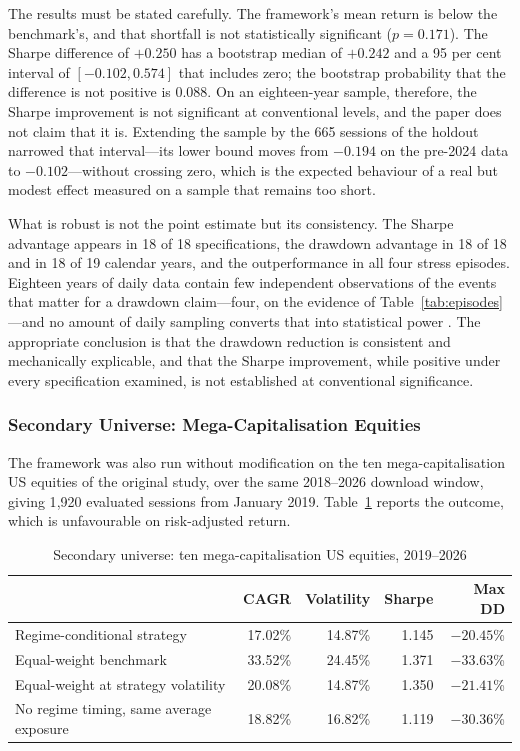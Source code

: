 \documentclass{singlecol-new}
\theoremstyle{TH}{
\newtheorem{lemma}{Lemma}
\newtheorem{theorem}[lemma]{Theorem}
\newtheorem{corrolary}[lemma]{Corrolary}
\newtheorem{conjecture}[lemma]{Conjecture}
\newtheorem{proposition}[lemma]{Proposition}
\newtheorem{claim}[lemma]{Claim}
\newtheorem{stheorem}[lemma]{Wrong Theorem}
\newtheorem{algorithm}{Algorithm}
}
\theoremstyle{THrm}{
\newtheorem{definition}{Definition}[section]
\newtheorem{question}{Question}[section]
\newtheorem{remark}{Remark}
\newtheorem{scheme}{Scheme}
}
\theoremstyle{THhit}{
\newtheorem{case}{Case}[section]
}
\begin{document}
The results must be stated carefully. The framework's mean return is below the
benchmark's, and that shortfall is not statistically significant ($p = 0.171$). The
Sharpe difference of $+0.250$ has a bootstrap median of $+0.242$ and a 95 per cent
interval of $[-0.102, 0.574]$ that includes zero; the bootstrap probability that the
difference is not positive is 0.088. On an eighteen-year sample, therefore, the Sharpe
improvement is not significant at conventional levels, and the paper does not claim that
it is. Extending the sample by the 665 sessions of the holdout narrowed that
interval---its lower bound moves from $-0.194$ on the pre-2024 data to $-0.102$---without
crossing zero, which is the expected behaviour of a real but modest effect measured on a
sample that remains too short.

What is robust is not the point estimate but its consistency. The Sharpe advantage
appears in 18 of 18 specifications, the drawdown advantage in 18 of 18 and in 18 of 19
calendar years, and the outperformance in all four stress episodes. Eighteen years of
daily data contain few independent observations of the events that matter for a drawdown
claim---four, on the evidence of Table~\ref{tab:episodes}---and no amount of daily
sampling converts that into statistical power \citep{harvey15}. The appropriate
conclusion is that the drawdown reduction is consistent and mechanically explicable, and
that the Sharpe improvement, while positive under every specification examined, is not
established at conventional significance.

\subsubsection{Secondary Universe: Mega-Capitalisation Equities}
\label{sec:megacap}

The framework was also run without modification on the ten mega-capitalisation US
equities of the original study, over the same 2018--2026 download window, giving 1{,}920
evaluated sessions from January 2019. Table~\ref{tab:megacap} reports the outcome, which
is unfavourable on risk-adjusted return.

\begin{table}[!ht]
\centering
\caption{Secondary universe: ten mega-capitalisation US equities, 2019--2026}
\label{tab:megacap}
\footnotesize
\begin{tabular}{p{4.8cm}rrrr}
\hline
& \textbf{CAGR} & \textbf{Volatility} & \textbf{Sharpe} & \textbf{Max DD} \\
\hline
Regime-conditional strategy & 17.02\% & 14.87\% & 1.145 & $-20.45$\% \\
Equal-weight benchmark & 33.52\% & 24.45\% & 1.371 & $-33.63$\% \\
Equal-weight at strategy volatility & 20.08\% & 14.87\% & 1.350 & $-21.41$\% \\
No regime timing, same average exposure & 18.82\% & 16.82\% & 1.119 & $-30.36$\% \\
\hline
\end{tabular}
\end{table}
\end{document}
